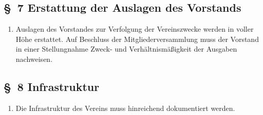 \documentclass[10pt,a4paper]{scrartcl}
\begin{document}
\subsection*{\S \ 7 Erstattung der Auslagen des Vorstands}
\begin{enumerate}
\item Auslagen des Vorstandes zur Verfolgung der Vereinszwecke werden
	in voller H{\"o}he erstattet. Auf Beschluss der Mitgliederversammlung
	muss der Vorstand in einer Stellungnahme Zweck- und Verh{\"a}ltnis\-m{\"a}{\ss}igkeit
	der Ausgaben nachweisen.
\end{enumerate}
%
%
\subsection*{\S \ 8 Infrastruktur}
%
\begin{enumerate}
\item Die Infrastruktur des Vereins muss hinreichend dokumentiert werden.
\end{enumerate}
\end{document}
